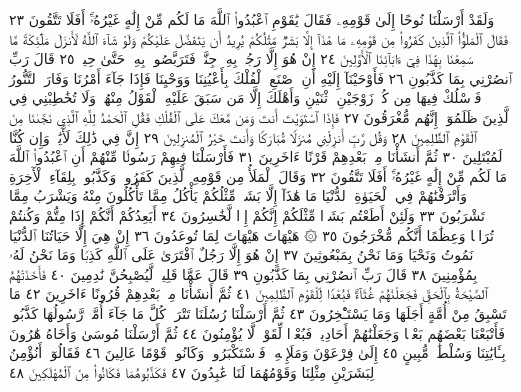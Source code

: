 وَلَقَدْ أَرْسَلْنَا نُوحًا إِلَىٰ قَوْمِهِۦ فَقَالَ يَٰقَوْمِ ٱعْبُدُوا۟ ٱللَّهَ
مَا لَكُم مِّنْ إِلَٰهٍ غَيْرُهُۥٓۚ أَفَلَا تَتَّقُونَ ٢٣ فَقَالَ ٱلْمَلَؤُا۟ ٱلَّذِينَ
كَفَرُوا۟ مِن قَوْمِهِۦ مَا هَٰذَآ إِلَّا بَشَرࣱ مِّثْلُكُمْ يُرِيدُ أَن يَتَفَضَّلَ عَلَيْكُمْ
وَلَوْ شَآءَ ٱللَّهُ لَأَنزَلَ مَلَٰٓئِكَةࣰ مَّا سَمِعْنَا بِهَٰذَا فِيٓ ءَابَآئِنَا
ٱلْأَوَّلِينَ ٢٤ إِنْ هُوَ إِلَّا رَجُلُۢ بِهِۦ جِنَّةࣱ فَتَرَبَّصُوا۟ بِهِۦ حَتَّىٰ حِينࣲ ٢٥
قَالَ رَبِّ ٱنصُرْنِي بِمَا كَذَّبُونِ ٢٦ فَأَوْحَيْنَآ إِلَيْهِ أَنِ ٱصْنَعِ
ٱلْفُلْكَ بِأَعْيُنِنَا وَوَحْيِنَا فَإِذَا جَآءَ أَمْرُنَا وَفَارَ ٱلتَّنُّورُ فَٱسْلُكْ
فِيهَا مِن كُلࣲّ زَوْجَيْنِ ٱثْنَيْنِ وَأَهْلَكَ إِلَّا مَن سَبَقَ عَلَيْهِ
ٱلْقَوْلُ مِنْهُمْۖ وَلَا تُخَٰطِبْنِي فِي ٱلَّذِينَ ظَلَمُوٓا۟ إِنَّهُم مُّغْرَقُونَ ٢٧
فَإِذَا ٱسْتَوَيْتَ أَنتَ وَمَن مَّعَكَ عَلَى ٱلْفُلْكِ فَقُلِ ٱلْحَمْدُ لِلَّهِ ٱلَّذِي
نَجَّىٰنَا مِنَ ٱلْقَوْمِ ٱلظَّٰلِمِينَ ٢٨ وَقُل رَّبِّ أَنزِلْنِي مُنزَلࣰا مُّبَارَكࣰا وَأَنتَ
خَيْرُ ٱلْمُنزِلِينَ ٢٩ إِنَّ فِي ذَٰلِكَ لَأٓيَٰتࣲ وَإِن كُنَّا لَمُبْتَلِينَ ٣٠ ثُمَّ أَنشَأْنَا
مِنۢ بَعْدِهِمْ قَرْنًا ءَاخَرِينَ ٣١ فَأَرْسَلْنَا فِيهِمْ رَسُولࣰا مِّنْهُمْ أَنِ ٱعْبُدُوا۟
ٱللَّهَ مَا لَكُم مِّنْ إِلَٰهٍ غَيْرُهُۥٓۚ أَفَلَا تَتَّقُونَ ٣٢ وَقَالَ ٱلْمَلَأُ مِن قَوْمِهِ
ٱلَّذِينَ كَفَرُوا۟ وَكَذَّبُوا۟ بِلِقَآءِ ٱلْأٓخِرَةِ وَأَتْرَفْنَٰهُمْ فِي ٱلْحَيَوٰةِ ٱلدُّنْيَا
مَا هَٰذَآ إِلَّا بَشَرࣱ مِّثْلُكُمْ يَأْكُلُ مِمَّا تَأْكُلُونَ مِنْهُ وَيَشْرَبُ
مِمَّا تَشْرَبُونَ ٣٣ وَلَئِنْ أَطَعْتُم بَشَرࣰا مِّثْلَكُمْ إِنَّكُمْ إِذࣰا لَّخَٰسِرُونَ ٣٤
أَيَعِدُكُمْ أَنَّكُمْ إِذَا مِتُّمْ وَكُنتُمْ تُرَابࣰا وَعِظَٰمًا أَنَّكُم مُّخْرَجُونَ ٣٥
۞ هَيْهَاتَ هَيْهَاتَ لِمَا تُوعَدُونَ ٣٦ إِنْ هِيَ إِلَّا حَيَاتُنَا
ٱلدُّنْيَا نَمُوتُ وَنَحْيَا وَمَا نَحْنُ بِمَبْعُوثِينَ ٣٧ إِنْ هُوَ إِلَّا
رَجُلٌ ٱفْتَرَىٰ عَلَى ٱللَّهِ كَذِبࣰا وَمَا نَحْنُ لَهُۥ بِمُؤْمِنِينَ ٣٨ قَالَ رَبِّ
ٱنصُرْنِي بِمَا كَذَّبُونِ ٣٩ قَالَ عَمَّا قَلِيلࣲ لَّيُصْبِحُنَّ نَٰدِمِينَ ٤٠
فَأَخَذَتْهُمُ ٱلصَّيْحَةُ بِٱلْحَقِّ فَجَعَلْنَٰهُمْ غُثَآءࣰۚ فَبُعْدࣰا لِّلْقَوْمِ
ٱلظَّٰلِمِينَ ٤١ ثُمَّ أَنشَأْنَا مِنۢ بَعْدِهِمْ قُرُونًا ءَاخَرِينَ ٤٢
مَا تَسْبِقُ مِنْ أُمَّةٍ أَجَلَهَا وَمَا يَسْتَـْٔخِرُونَ ٤٣ ثُمَّ أَرْسَلْنَا رُسُلَنَا
تَتْرَاۖ كُلَّ مَا جَآءَ أُمَّةࣰ رَّسُولُهَا كَذَّبُوهُۖ فَأَتْبَعْنَا بَعْضَهُم بَعْضࣰا
وَجَعَلْنَٰهُمْ أَحَادِيثَۚ فَبُعْدࣰا لِّقَوْمࣲ لَّا يُؤْمِنُونَ ٤٤ ثُمَّ أَرْسَلْنَا مُوسَىٰ
وَأَخَاهُ هَٰرُونَ بِـَٔايَٰتِنَا وَسُلْطَٰنࣲ مُّبِينٍ ٤٥ إِلَىٰ فِرْعَوْنَ وَمَلَإِي۟هِۦ
فَٱسْتَكْبَرُوا۟ وَكَانُوا۟ قَوْمًا عَالِينَ ٤٦ فَقَالُوٓا۟ أَنُؤْمِنُ لِبَشَرَيْنِ مِثْلِنَا
وَقَوْمُهُمَا لَنَا عَٰبِدُونَ ٤٧ فَكَذَّبُوهُمَا فَكَانُوا۟ مِنَ ٱلْمُهْلَكِينَ ٤٨
